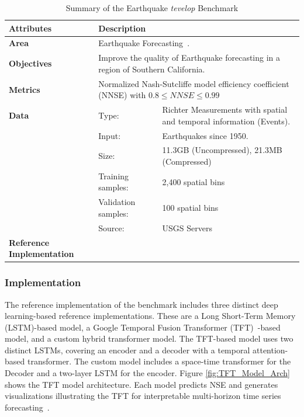 \documentclass[utf8]{FrontiersinVancouver} %
\begin{document}
\begin{table}
\caption{Summary of the Earthquake {\em tevelop} Benchmark}\label{tab:eq-summary}
\begin{center}
  {\footnotesize
\begin{tabular}{|p{}p{}p{}|}
\hline
{\bf Attributes} & {\bf Description} \\
\hline
\hline
{\bf Area} & \multicolumn{2}{l|}{Earthquake Forecasting~\citep{fox2022-jm,TFT-21,eq-code,eq-data}.}\\
\hline
{\bf Objectives} &  \multicolumn{2}{l|}{Improve the quality of Earthquake
forecasting in a region of Southern California.}\\
\hline
{\bf Metrics} & \multicolumn{2}{l|}{Normalized Nash-Sutcliffe model efficiency coefficient (NNSE) with $0.8\leq NNSE\leq 0.99$}\\
\hline
{\bf Data}  & Type:  & Richter Measurements with spatial and temporal information (Events). \\
  &  Input:  & Earthquakes since 1950.\\
  &  Size:  & 11.3GB (Uncompressed), 21.3MB (Compressed)\\
  & Training samples: & 2,400 spatial bins\\
  & Validation samples:  &  100 spatial bins\\
  & Source:  & USGS Servers~\citep{eq-data}\\
\hline
{\bf Reference Implementation} & \citep{eq-code} & \\
\hline
\end{tabular}
}
\end{center}
\end{table}


\subsubsection{Implementation}

The reference implementation of the benchmark includes three distinct deep learning-based reference implementations. These are a Long Short-Term Memory (LSTM)-based model, a Google Temporal Fusion Transformer (TFT)~\citep{TFT-21}-based model, and a custom hybrid transformer model. The TFT-based model uses two distinct LSTMs, covering an encoder and a decoder with a temporal attention-based transformer. The custom model includes a space-time transformer for the Decoder and a two-layer LSTM for the encoder. Figure \ref{fig:TFT_Model_Arch} shows the TFT model architecture. Each model predicts NSE and generates visualizations illustrating the TFT for interpretable multi-horizon time series forecasting~\citep{TFT-21}.
\end{document}
